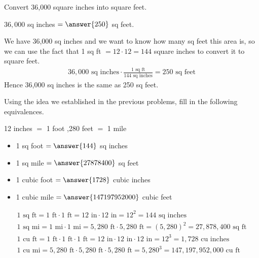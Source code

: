 \documentclass[12pt]{ximera}
\begin{document}
\begin{problem}
Convert 36,000 square inches into square feet.

$36{,}000$ sq inches $= \answer{250}$ sq feet.

\begin{solution}
We have 36,000 sq inches and we want to know how many sq feet this area is, so we can
use the fact that 1 sq ft $= 12 \cdot 12 = 144$ square inches to convert it to square
feet.
\begin{gather*}
36{,}000\text{ sq inches} \cdot \frac{1\text{ sq ft}}{144\text{ sq inches}} = 250\text{ sq feet}
\end{gather*}
Hence 36,000 sq inches is the same as 250 sq feet.
\end{solution}
\end{problem}

\begin{problem}
Using the idea we established in the previous problems, fill in the following
equivalences.

\hspace{1em} 12 inches $=$ 1 foot ,280 feet $=$ 1 mile

\begin{itemize}
\item 1 sq foot $= \answer{144}$ sq inches
\item 1 sq mile $= \answer{27878400}$ sq feet
\item 1 cubic foot $= \answer{1728}$ cubic inches
\item 1 cubic mile $= \answer{147197952000}$ cubic feet
\end{itemize}



\begin{solution}
\begin{gather*}
1\text{ sq ft} = 1\text{ ft} \cdot 1\text{ ft} = 12\text{ in} \cdot 12\text{ in}
= 12^{2} = 144\text{ sq inches} \\
1\text{ sq mi} = 1\text{ mi} \cdot 1\text{ mi} = 5{,}280\text{ ft} \cdot 5{,}280\text{ ft}
= (5{,}280)^{2} = 27{,}878{,}400\text{ sq ft} \\
1\text{ cu ft} = 1\text{ ft} \cdot 1\text{ ft} \cdot 1\text{ ft}
= 12\text{ in} \cdot 12\text{ in} \cdot 12\text{ in} = 12^{3} = 1{,}728\text{ cu inches} \\
1\text{ cu mi} = 5{,}280\text{ ft} \cdot 5{,}280\text{ ft} \cdot 5{,}280\text{ ft}
= 5{,}280^{3} = 147{,}197{,}952{,}000\text{ cu ft}
\end{gather*}
\end{solution}
\end{problem}
\end{document}

